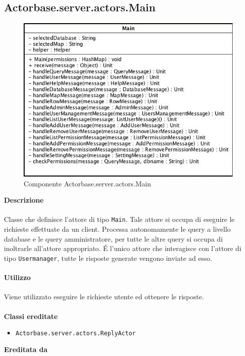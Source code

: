 \documentclass[a4paper]{article}
\begin{document}
	\subsection{Actorbase.server.actors.Main}
		\begin{figure}[H]
			\centering
			\includegraphics[width=\textwidth]{Server/main.jpg}
			\caption{Componente Actorbase.server.actors.Main}
		\end{figure}
		\textbf{Descrizione}
			\\ \\
			Classe che definisce l'attore di tipo \texttt{Main}. Tale attore si occupa di eseguire le richieste effettuate da un client. Processa autonomamente le query a livello database e le query amministratore, per tutte le altre query si occupa di inoltrarle all'attore appropriato. \'E l'unico attore che interagisce con l'attore di tipo \texttt{Usermanager}, tutte le risposte generate vengono inviate ad esso.
			\\ \\
		\textbf{Utilizzo}
			\\ \\
			Viene utilizzato eseguire le richieste utente ed ottenere le risposte.
			\\ \\
		\textbf{Classi ereditate}
			\begin{itemize}
				\item \texttt{Actorbase.server.actors.ReplyActor}
			\end{itemize}
		\textbf{Ereditata da}
			\\ \\
\end{document}
